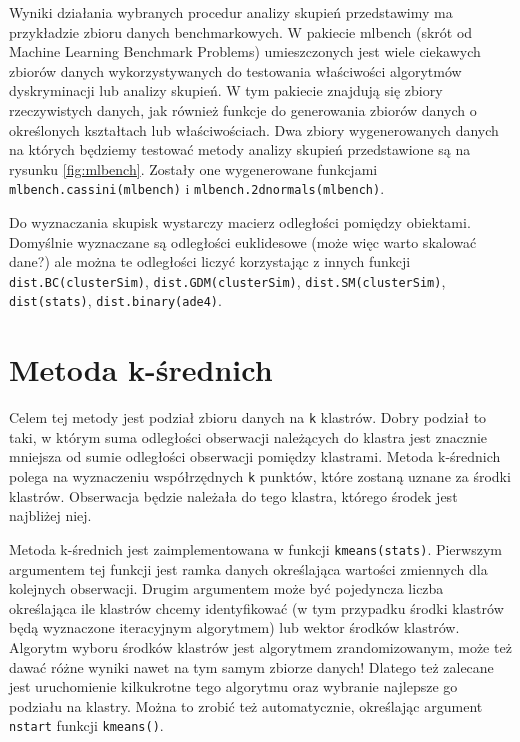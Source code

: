 \documentclass[polish,]{book}
\begin{document}
Wyniki działania wybranych procedur analizy skupień przedstawimy ma przykładzie zbioru danych benchmarkowych. W pakiecie mlbench (skrót od Machine
Learning Benchmark Problems) umieszczonych jest wiele ciekawych zbiorów danych
wykorzystywanych do testowania właściwości algorytmów dyskryminacji lub analizy skupień. W tym pakiecie znajdują się zbiory rzeczywistych danych, jak również
funkcje do generowania zbiorów danych o określonych kształtach lub właściwościach.
Dwa zbiory wygenerowanych danych na których będziemy testować metody analizy skupień przedstawione są na rysunku \ref{fig:mlbench}. Zostały one wygenerowane funkcjami
\texttt{mlbench.cassini(mlbench)} i \texttt{mlbench.2dnormals(mlbench)}.

Do wyznaczania skupisk wystarczy macierz odległości pomiędzy obiektami. Domyślnie wyznaczane są odległości euklidesowe (może więc warto skalować dane?)
ale można te odległości liczyć korzystając z innych funkcji \texttt{dist.BC(clusterSim)},
\texttt{dist.GDM(clusterSim)}, \texttt{dist.SM(clusterSim)}, \texttt{dist(stats)}, \texttt{dist.binary(ade4)}.

\hypertarget{part_31}{%
\section{Metoda k-średnich}\label{part_31}}

Celem tej metody jest podział zbioru danych na \texttt{k} klastrów. Dobry podział to taki,
w którym suma odległości obserwacji należących do klastra jest znacznie mniejsza
od sumie odległości obserwacji pomiędzy klastrami. Metoda k-średnich polega na
wyznaczeniu współrzędnych \texttt{k} punktów, które zostaną uznane za środki klastrów.
Obserwacja będzie należała do tego klastra, którego środek jest najbliżej niej.

Metoda k-średnich jest zaimplementowana w funkcji \texttt{kmeans(stats)}. Pierwszym
argumentem tej funkcji jest ramka danych określająca wartości zmiennych dla kolejnych obserwacji. Drugim argumentem może być pojedyncza liczba określająca ile
klastrów chcemy identyfikować (w tym przypadku środki klastrów będą wyznaczone
iteracyjnym algorytmem) lub wektor środków klastrów. Algorytm wyboru środków
klastrów jest algorytmem zrandomizowanym, może też dawać różne wyniki nawet
na tym samym zbiorze danych! Dlatego też zalecane jest uruchomienie kilkukrotne
tego algorytmu oraz wybranie najlepsze go podziału na klastry. Można to zrobić też
automatycznie, określając argument \texttt{nstart} funkcji \texttt{kmeans()}.
\end{document}
